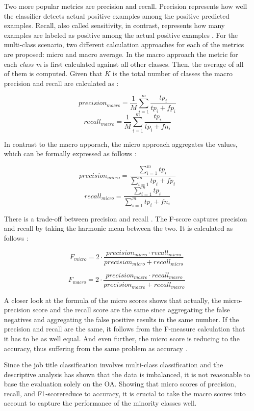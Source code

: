 \documentclass[12pt, a4paper, titlepage]{article}
\begin{document}
Two more popular metrics are precision and recall. Precision represents how well the classifier detects actual positive examples among the positive predicted examples. Recall, also called sensitivity, in contrast, represents how many examples are labeled as positive among the actual positive examples \citep{Berthold2020}. For the multi-class scenario, two different calculation approaches for each of the metrics are proposed: micro and macro average. In the macro approach the metric for each \textit{class m} is first calculated against all other classes. Then, the average of all of them is computed. Given that $K$ is the total number of classes the macro precision and recall are calculated as \citep{Branco2017}:

\[precision_{macro} = \frac{1}{M} \sum_{i=1}^m \frac{tp_{i}}{tp_{i} + fp_{i}}\]
\[recall_{macro} = \frac{1}{M} \sum_{i=1}^m \frac{tp_{i}}{tp_{i} + fn_{i}}\]

In contrast to the macro apporach, the micro approach aggregates the values, which can be formally expressed as follows \citep{Branco2017}: 

\[precision_{micro} = \frac{\sum_{i=1}^m tp_i}{\sum_{i=1}^m tp_i + fp_i}\]
\[recall_{micro} = \frac{\sum_{i=1}^m tp_i}{\sum_{i=1}^m tp_i + fn_i}\]

There is a trade-off between precision and recall \citep{Buckland1994}. The F-score captures precision and recall by taking the harmonic mean between the two. It is calculated as follows \citep{Branco2017,Pan2016}:  

\[F_{micro} = 2 \cdot \frac{precision_{micro} \cdot recall_{micro} }{precision_{micro} + recall_{micro} }\ \]

\[F_{macro} = 2 \cdot \frac{precision_{macro} \cdot recall_{macro} }{precision_{macro} + recall_{macro} }\ \]

A closer look at the formula of the micro scores shows that actually, the micro-precision score and the recall score are the same since aggregating the false negatives and aggregating the false positive results in the same number. If the precision and recall are the same, it follows from the F-measure calculation that it has to be as well equal. And even further, the micro score is reducing to the accuracy, thus suffering from the same problem as accuracy \citep{grandini2020}.

Since the job title classification involves multi-class classification and the descriptive analysis has shown that the data is imbalanced, it is not reasonable to base the evaluation solely on the \ac{OA}. Showing that micro scores of precision, recall, and F1-scorereduce to accuracy, it is crucial to take the macro scores into account to capture the performance of the minority classes well.
\end{document}
